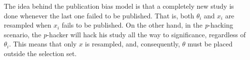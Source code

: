 \documentclass{article}
\theoremstyle{plain}
\theoremstyle{definition}
\begin{document}







The idea behind the publication bias model is that a completely new study is done whenever the last one failed to be published. That is, both $\theta_i$ and $x_i$ are resampled when $x_i$ fails to be published. On the other hand, in the \textit{p}-hacking scenario, the \textit{p}-hacker will hack his study all the way to significance, regardless of $\theta_i$. This means that only $x$  is resampled, and, consequently, $\theta$ must be placed outside the selection set. 
\end{document}

